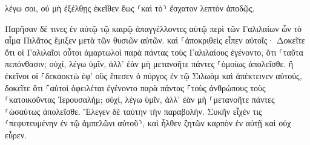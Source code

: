 \documentclass{openreader}
\begin{document}
λέγω σοι, οὐ μὴ ἐξέλθῃς ἐκεῖθεν ἕως ⸂καὶ τὸ⸃ ἔσχατον λεπτὸν ἀποδῷς. 

Παρῆσαν δέ τινες ἐν αὐτῷ τῷ καιρῷ ἀπαγγέλλοντες αὐτῷ περὶ τῶν Γαλιλαίων ὧν τὸ αἷμα Πιλᾶτος ἔμιξεν μετὰ τῶν θυσιῶν αὐτῶν. 
καὶ ⸀ἀποκριθεὶς εἶπεν αὐτοῖς· Δοκεῖτε ὅτι οἱ Γαλιλαῖοι οὗτοι ἁμαρτωλοὶ παρὰ πάντας τοὺς Γαλιλαίους ἐγένοντο, ὅτι ⸀ταῦτα πεπόνθασιν; 
οὐχί, λέγω ὑμῖν, ἀλλ’ ἐὰν μὴ μετανοῆτε πάντες ⸀ὁμοίως ἀπολεῖσθε. 
ἢ ἐκεῖνοι οἱ ⸀δεκαοκτὼ ἐφ’ οὓς ἔπεσεν ὁ πύργος ἐν τῷ Σιλωὰμ καὶ ἀπέκτεινεν αὐτούς, δοκεῖτε ὅτι ⸀αὐτοὶ ὀφειλέται ἐγένοντο παρὰ πάντας ⸀τοὺς ἀνθρώπους τοὺς ⸀κατοικοῦντας Ἰερουσαλήμ; 
οὐχί, λέγω ὑμῖν, ἀλλ’ ἐὰν μὴ ⸀μετανοῆτε πάντες ⸀ὡσαύτως ἀπολεῖσθε. 
Ἔλεγεν δὲ ταύτην τὴν παραβολήν. Συκῆν εἶχέν τις ⸂πεφυτευμένην ἐν τῷ ἀμπελῶνι αὐτοῦ⸃, καὶ ἦλθεν ζητῶν καρπὸν ἐν αὐτῇ καὶ οὐχ εὗρεν. 
\end{document}
